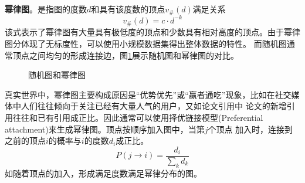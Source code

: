 \documentclass[master]{thesis-uestc}
\begin{document}
    \textbf{幂律图}。是指图的度数$d$和具有该度数的顶点$v_{\#}(d)$满足关系
\begin{equation*}
    v_{\#}(d)=c \cdot d^{-k}
\end{equation*}
该式表示了幂律图有大量具有极低度的顶点和少数具有相对高度的顶点。由于幂律图分体现了无标度性，可以使用小规模数据集得出整体数据的特性。
而随机图通常顶点之间均匀的形成连接边，图\ref{fig:rand-vs-pow}展示随机图和幂律图的对比。

\begin{figure}
    \caption{随机图和幂律图}
    \label{fig:rand-vs-pow}

\end{figure}

    真实世界中，幂律图主要构成原因是“优势优先”或“赢者通吃”现象，比如在社交媒体中人们往往倾向于关注已经有大量人气的用户，又如论文引用中
论文的新增引用往往和已有引用成正比。因此通常可以使用择优链接模型(Preferential attachment)来生成幂律图。顶点按顺序加入图中，当第$j$个顶点
加入时，连接到之前的顶点$i$的概率与$i$的度数$d_i$成正比。
\begin{equation*}
    P(j \rightarrow i)=\frac{d_i}{\sum_k d_k}
\end{equation*}
    如随着顶点的加入，形成满足度数满足幂律分布的图。
\end{document}
